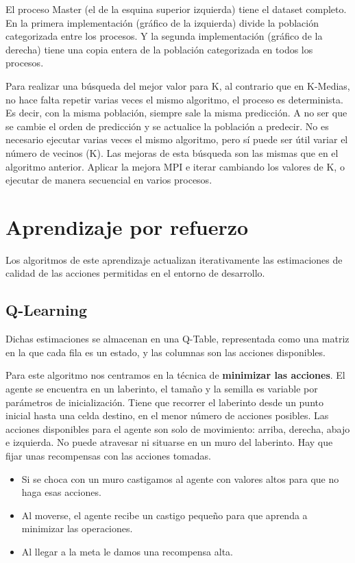 		El proceso Master (el de la esquina superior izquierda) tiene el dataset completo. En la primera implementación (gráfico de la izquierda) divide la población categorizada entre los procesos. Y la segunda implementación (gráfico de la derecha) tiene una copia entera de la población categorizada en todos los procesos.
		
		
		Para realizar una búsqueda del mejor valor para K, al contrario que en K-Medias, no hace falta repetir varias veces el mismo algoritmo, el proceso es determinista. Es decir, con la misma población, siempre sale la misma predicción. A no ser que se cambie el orden de predicción y se actualice la población a predecir. No es necesario ejecutar varias veces el mismo algoritmo, pero sí puede ser útil variar el número de vecinos (K). Las mejoras de esta búsqueda son las mismas que en el algoritmo anterior. Aplicar la mejora MPI e iterar cambiando los valores de K, o ejecutar de manera secuencial en varios procesos.

\newpage

\section{Aprendizaje por refuerzo}

	Los algoritmos de este aprendizaje actualizan iterativamente las estimaciones de calidad de las acciones permitidas en el entorno de desarrollo. 
	
	\subsection{Q-Learning}
		Dichas estimaciones se almacenan en una Q-Table, representada como una matriz en la que cada fila es un estado, y las columnas son las acciones disponibles. 
		
		Para este algoritmo nos centramos en la técnica de \textbf{minimizar las acciones}. El agente se encuentra en un laberinto, el tamaño y la semilla es variable por parámetros de inicialización. Tiene que recorrer el laberinto desde un punto inicial hasta una celda destino, en el menor número de acciones posibles. Las acciones disponibles para el agente son solo de movimiento: arriba, derecha, abajo e izquierda. No puede atravesar ni situarse en un muro del laberinto. Hay que fijar unas recompensas con las acciones tomadas. 	
		\begin{itemize}
			\item Si se choca con un muro castigamos al agente con valores altos para que no haga esas acciones.
			\vspace*{-0.2cm}
			\item Al moverse, el agente recibe un castigo pequeño para que aprenda a minimizar las operaciones.
			\vspace*{-0.2cm}
			\item Al llegar a la meta le damos una recompensa alta. 		
			\vspace*{-0.2cm}
		\end{itemize}
	
